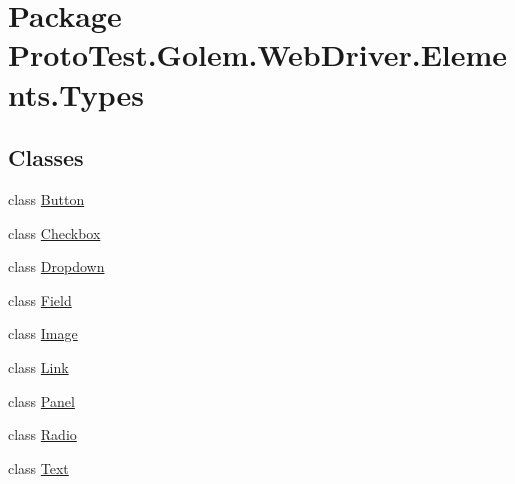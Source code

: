 \hypertarget{namespace_proto_test_1_1_golem_1_1_web_driver_1_1_elements_1_1_types}{\section{Package Proto\-Test.\-Golem.\-Web\-Driver.\-Elements.\-Types}
\label{namespace_proto_test_1_1_golem_1_1_web_driver_1_1_elements_1_1_types}
}
\subsection*{Classes}
\begin{DoxyCompactItemize}
\item 
class \hyperlink{class_proto_test_1_1_golem_1_1_web_driver_1_1_elements_1_1_types_1_1_button}{Button}
\item 
class \hyperlink{class_proto_test_1_1_golem_1_1_web_driver_1_1_elements_1_1_types_1_1_checkbox}{Checkbox}
\item 
class \hyperlink{class_proto_test_1_1_golem_1_1_web_driver_1_1_elements_1_1_types_1_1_dropdown}{Dropdown}
\item 
class \hyperlink{class_proto_test_1_1_golem_1_1_web_driver_1_1_elements_1_1_types_1_1_field}{Field}
\item 
class \hyperlink{class_proto_test_1_1_golem_1_1_web_driver_1_1_elements_1_1_types_1_1_image}{Image}
\item 
class \hyperlink{class_proto_test_1_1_golem_1_1_web_driver_1_1_elements_1_1_types_1_1_link}{Link}
\item 
class \hyperlink{class_proto_test_1_1_golem_1_1_web_driver_1_1_elements_1_1_types_1_1_panel}{Panel}
\item 
class \hyperlink{class_proto_test_1_1_golem_1_1_web_driver_1_1_elements_1_1_types_1_1_radio}{Radio}
\item 
class \hyperlink{class_proto_test_1_1_golem_1_1_web_driver_1_1_elements_1_1_types_1_1_text}{Text}
\end{DoxyCompactItemize}
